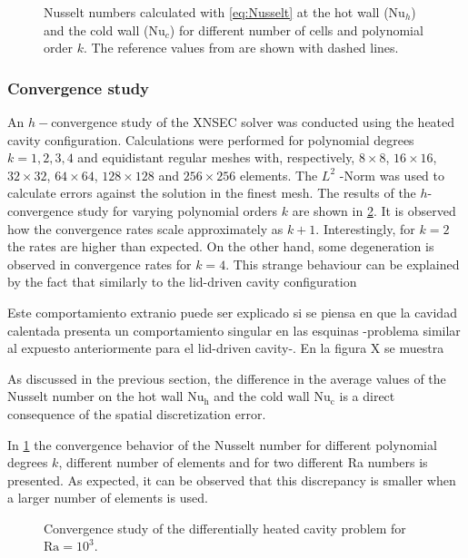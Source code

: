 
\begin{figure}[b!]
	\centering
	\caption{Nusselt numbers calculated with \cref{eq:Nusselt} at the hot wall ($\text{Nu}_h$) and the cold wall ($\text{Nu}_c$) for different number of cells and polynomial order $k$. The reference values from \cite{vierendeelsBenchmarkSolutionsNatural2003} are shown with dashed lines.}\label{fig:NusseltStudy}
\end{figure}

\subsubsection{Convergence study}\label{ssec:ConvStudyHeatedCavity}
An $h-$convergence study of the XNSEC solver was conducted using the heated cavity configuration. Calculations were performed for polynomial degrees $k = {1,2,3,4}$ and equidistant regular meshes with, respectively, $8\times8$, $16\times16$, $32\times32$, $64\times64$, $128\times128$ and $256\times256$ elements.  The $L^2$ -Norm was used to calculate errors against the solution in the finest mesh. The results of the $h$-convergence study for varying polynomial orders $k$ are shown in \cref{fig:ConvergenceDHC}. It is observed how the convergence rates scale approximately as $k+1$. Interestingly, for $k=2$ the rates are higher than expected. On the other hand, some degeneration is observed in convergence rates for $k = 4$. This strange behaviour can be explained by the fact that similarly to the lid-driven cavity configuration

Este comportamiento extranio puede ser explicado si se piensa en que la cavidad calentada presenta un comportamiento singular en las esquinas -problema similar al expuesto anteriormente para el lid-driven cavity-. En la figura X se muestra 

As discussed in the previous section, the difference in the average values of the Nusselt number on the hot wall $\text{Nu}_\text{h}$  and the cold wall $\text{Nu}_\text{c}$ is a direct consequence of the spatial discretization error.

In \cref{fig:NusseltStudy} the convergence behavior of the Nusselt number for different polynomial degrees $k$, different number of elements and for two different Ra numbers is presented. As expected, it can be observed that this discrepancy is smaller when a larger number of elements is used.


\begin{figure}[t!]
	\centering
	\pgfplotsset{width=0.34\textwidth, compat=1.3}
	\caption{Convergence study of the differentially heated cavity problem for $\text{Ra} = 10^3$.}\label{fig:ConvergenceDHC}
\end{figure}

\FloatBarrier